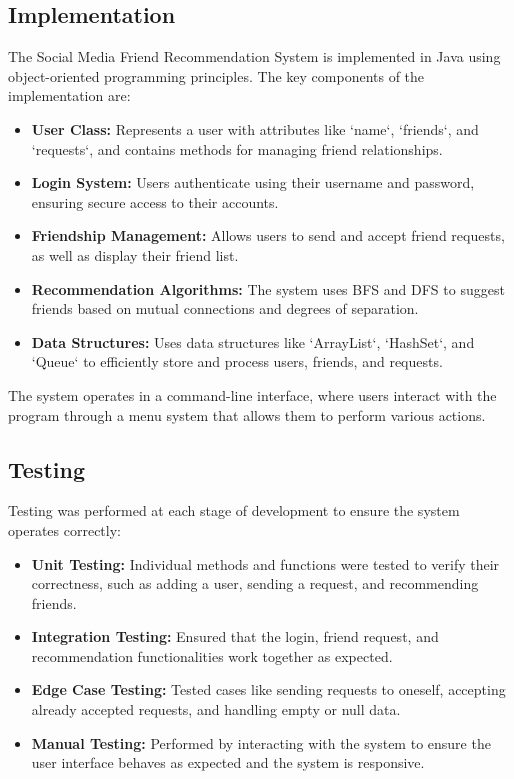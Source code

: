 \documentclass[12pt]{report}
\begin{document}
\subsection{Implementation}
The Social Media Friend Recommendation System is implemented in Java using object-oriented programming principles. The key components of the implementation are:

\begin{itemize}
    \item \textbf{User Class:} Represents a user with attributes like `name`, `friends`, and `requests`, and contains methods for managing friend relationships.
    \item \textbf{Login System:} Users authenticate using their username and password, ensuring secure access to their accounts.
    \item \textbf{Friendship Management:} Allows users to send and accept friend requests, as well as display their friend list.
    \item \textbf{Recommendation Algorithms:} The system uses BFS and DFS to suggest friends based on mutual connections and degrees of separation.
    \item \textbf{Data Structures:} Uses data structures like `ArrayList`, `HashSet`, and `Queue` to efficiently store and process users, friends, and requests.
\end{itemize}

The system operates in a command-line interface, where users interact with the program through a menu system that allows them to perform various actions.

\subsection{Testing}
Testing was performed at each stage of development to ensure the system operates correctly:
\begin{itemize}
    \item \textbf{Unit Testing:} Individual methods and functions were tested to verify their correctness, such as adding a user, sending a request, and recommending friends.
    \item \textbf{Integration Testing:} Ensured that the login, friend request, and recommendation functionalities work together as expected.
    \item \textbf{Edge Case Testing:} Tested cases like sending requests to oneself, accepting already accepted requests, and handling empty or null data.
    \item \textbf{Manual Testing:} Performed by interacting with the system to ensure the user interface behaves as expected and the system is responsive.
\end{itemize}
\end{document}
